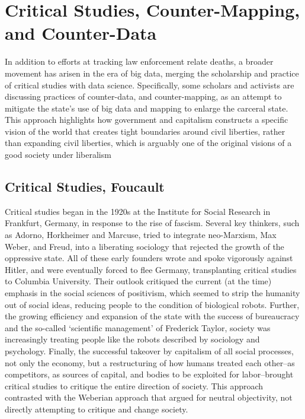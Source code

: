 \documentclass[sigconf]{acmart}
\begin{document}
\section{Critical Studies, Counter-Mapping, and Counter-Data}
In addition to efforts at tracking law enforcement relate deaths, a broader movement has arisen in the era of big data, merging the scholarship and practice of critical studies with data science.  Specifically, some scholars and activists are discussing practices of counter-data, and counter-mapping, as an attempt to mitigate the state's use of big data and mapping to enlarge the carceral state. \cite{jefferson17,currie16,dalton17,ccc12}  This approach highlights how government and capitalism constructs a specific vision of the world that creates tight boundaries around civil liberties, rather than expanding civil liberties, which is arguably one of the original visions of a good society under liberalism

\subsection{Critical Studies, Foucault}
Critical studies began in the 1920s at the Institute for Social Research in Frankfurt, Germany, in response to the rise of fascism. \cite{ritzer18,seidman16}  Several key thinkers, such as Adorno, Horkheimer and Marcuse, tried to integrate neo-Marxism, Max Weber, and Freud, into a liberating sociology that rejected the growth of the oppressive state.  All of these early founders wrote and spoke vigorously against Hitler, and were eventually forced to flee Germany, transplanting critical studies to Columbia University. \cite{ritzer18}   Their outlook critiqued the current (at the time) emphasis in the social sciences of positivism, which seemed to strip the humanity out of social ideas, reducing people to the condition of biological robots.  Further, the growing efficiency and expansion of the state with the success of bureaucracy and the so-called `scientific management' of Frederick Taylor, society was increasingly treating people like the robots described by sociology and psychology.  Finally, the successful takeover by capitalism of all social processes, not only the economy, but a restructuring of how humans treated each other--as competitors, as sources of capital, and bodies to be exploited for labor--brought critical studies to critique the entire direction of society.  This approach contrasted with the Weberian approach that argued for neutral objectivity, not directly attempting to critique and change society. \cite{ritzer18,seidman16}
\end{document}
